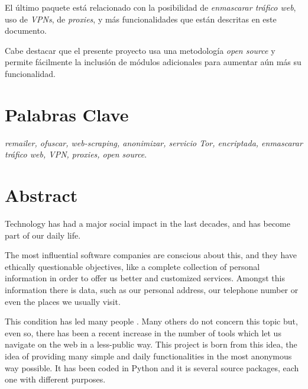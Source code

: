 El último paquete está relacionado con la posibilidad de
\textit{enmascarar tráfico web}, uso de \textit{VPNs}, de
\textit{proxies}, y más funcionalidades que están descritas en este
documento.

Cabe destacar que el presente proyecto usa una metodología
\textit{open source} y permite fácilmente la inclusión de módulos
adicionales para aumentar aún más su funcionalidad.

\section*{Palabras Clave}
\textit{remailer, ofuscar, web-scraping, anonimizar, servicio Tor, encriptada, enmascarar tráfico web, VPN, proxies, open source}.
\newpage

\section*{Abstract}
Technology has had a major social impact in the last decades, and has become part of our daily life.

The most influential software companies are conscious about this, and
they have ethically questionable objectives, like a complete
collection of personal information in order to offer us better and
customized services. Amongst this information there is
 data, such as our personal address, our telephone
number or even the places we usually visit. 

This condition has led many people . Many others do not concern this topic but, even so, there
has been a recent increase in the number of tools which let us
navigate on the web in a less-public way. This project is born from
this idea, the idea of providing many simple and daily functionalities
in the most anonymous way possible. It has been coded in Python and it
is  several source packages, each one with different
purposes.

